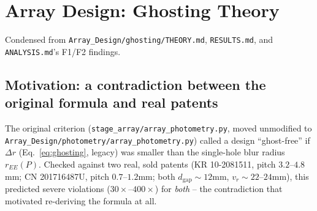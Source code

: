 \documentclass[11pt]{report}
\newcommand{\dgap}{d_{\text{gap}}}
\newcommand{\vr}{v_r}
\begin{document}
\chapter{Array Design: Ghosting Theory}
\label{ch:array}
Condensed from \texttt{Array\_Design/ghosting/THEORY.md}, \texttt{RESULTS.md}, and
\texttt{ANALYSIS.md}'s F1/F2 findings.

\section{Motivation: a contradiction between the original formula and real patents}
The original criterion (\texttt{stage\_array/array\_photometry.py}, moved unmodified to
\texttt{Array\_Design/photometry/array\_photometry.py}) called a design ``ghost-free'' if
$\Delta r$ (Eq.~\ref{eq:ghosting}, legacy) was smaller than the single-hole blur radius
$r_{EE}(P)$. Checked against two real, sold patents (KR 10-2081511, pitch $3.2$--$4.8$mm; CN
201716487U, pitch $0.7$--$1.2$mm; both $\dgap\!\sim\!12$mm, $\vr\!\sim\!22$--$24$mm), this
predicted severe violations ($30\times$--$400\times$) for \emph{both} -- the contradiction
that motivated re-deriving the formula at all.
\end{document}
